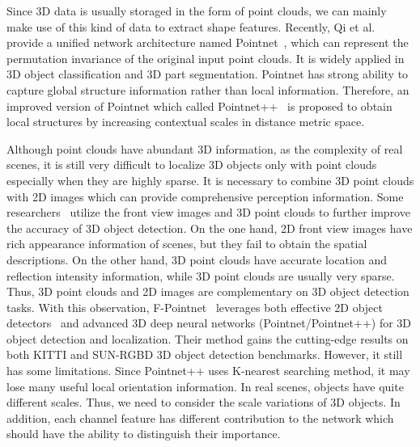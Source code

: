 \documentclass[letterpaper]{article}
\begin{document}
Since 3D data is usually storaged in the form of point clouds, we can mainly make use of this kind of data to extract shape features. Recently, Qi et al. provide a unified network architecture named Pointnet~\cite{qi2017pointnet}, which can represent the permutation invariance of the original input point clouds. It is widely applied in 3D object classification and 3D part segmentation. Pointnet has strong ability to capture global structure information rather than local information. Therefore, an improved version of Pointnet which called Pointnet++~\cite{qi2017pointnet++} is proposed to obtain local structures by increasing contextual scales in distance metric space.

Although point clouds have abundant 3D information, as the complexity of real scenes, it is still very difficult to localize 3D objects only with point clouds especially when they are highly sparse. It is necessary to combine 3D point clouds with 2D images which can provide comprehensive perception information. Some researchers~\cite{wang2017fusing,ku2018joint} utilize the front view images and 3D point clouds to further improve the accuracy of 3D object detection. On the one hand, 2D front view images have rich appearance information of scenes, but they fail to obtain the spatial descriptions. On the other hand, 3D point clouds have accurate location and reflection intensity information, while 3D point clouds are usually very sparse. Thus, 3D point clouds and 2D images are complementary on 3D object detection tasks. With this observation, F-Pointnet~\cite{qi2017frustum} leverages both effective 2D object detectors~\cite{fu2017dssd,lin2017feature} and advanced 3D deep neural networks (Pointnet/Pointnet++) for 3D object detection and localization. Their method gains the cutting-edge results on both KITTI and SUN-RGBD 3D object detection benchmarks. However, it still has some limitations. Since Pointnet++ uses K-nearest searching method, it may lose many useful local orientation information. In real scenes, objects have quite different scales. Thus, we need to consider the scale variations of 3D objects. In addition, each channel feature has different contribution to the network which should have the ability to distinguish their importance.
\end{document}
